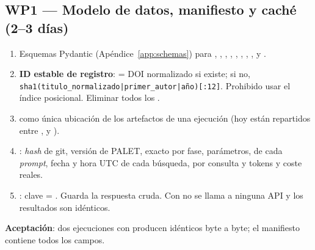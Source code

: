 \documentclass[11pt,a4paper]{article}
\newcommand{\WP}[1]{\textbf{\textcolor{palet}{WP#1}}}
\begin{document}
\subsection*{\WP{1} — Modelo de datos, manifiesto y caché (2--3 días)}
\begin{enumerate}
  \item Esquemas Pydantic (Apéndice~\ref{app:schemas}) para , , , , , , , ,  y .
  \item \textbf{ID estable de registro}:  = DOI normalizado si existe; si no, \texttt{sha1(titulo\_normalizado|primer\_autor|año)[:12]}. Prohibido usar el índice posicional. Eliminar todos los .
  \item {} como única ubicación de los artefactos de una ejecución (hoy están repartidos entre ,  y ).
  \item {}: \emph{hash} de git, versión de PALET,  exacto por fase, parámetros,  de cada \emph{prompt}, fecha y hora UTC de cada búsqueda,  por consulta y tokens y coste reales.
  \item {}: clave = . Guarda la respuesta cruda. Con  no se llama a ninguna API y los resultados son idénticos.
\end{enumerate}
\textbf{Aceptación}: dos ejecuciones con  producen  idénticos byte a byte; el manifiesto contiene todos los campos.

\end{document}
